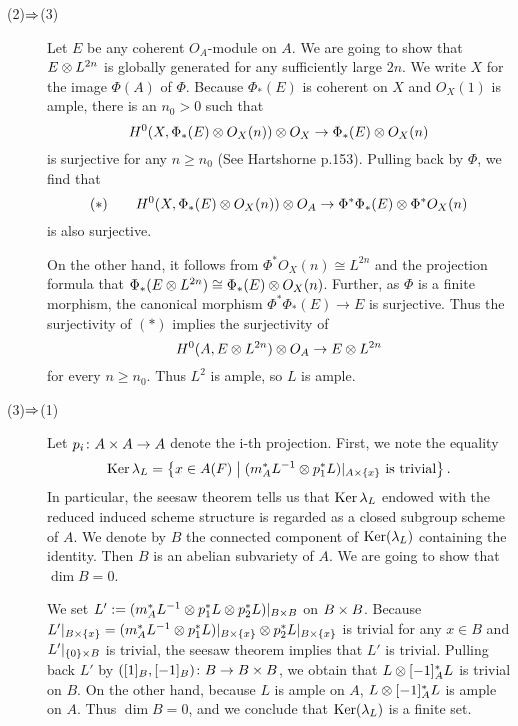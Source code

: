 {\begin{description}
  \item[(2)$\Rightarrow$(3)] Let $E$ be any coherent $O_A$-module on $A$. We are going to show that $E \otimes L^{2n}$ is globally generated for any sufficiently large $2n$. We write $X$ for the image $\Phi(A)$ of $\Phi$. Because $\Phi_*(E)$ is coherent on $X$ and $O_X(1)$ is ample, there is an $n_0 > 0$ such that
  \[
  H^0(X, \Phi_*(E) \otimes O_X(n) ) \otimes O_X \to \Phi_*(E) \otimes O_X(n)
  \]
  is surjective for any $n \geq n_0$ (See Hartshorne p.153). Pulling back by $\Phi$, we find that
  \[
  (*)  \quad  \quad    H^0(X, \Phi_*(E) \otimes O_X(n) ) \otimes O_A \to \Phi^* \Phi_*(E) \otimes \Phi^* O_X(n)
  \]
  is also surjective.

  On the other hand, it follows from $\Phi^* O_X(n) \cong L^{2n}$ and the projection formula that $\Phi_*(E \otimes L^{2n}) \cong \Phi_*(E) \otimes O_X(n)$. Further, as $\Phi$ is a finite morphism, the canonical morphism $\Phi^* \Phi_*(E) \to E$ is surjective. Thus the surjectivity of $(*)$ implies the surjectivity of
  \[
  H^0(A, E \otimes L^{2n} ) \otimes O_A \to E \otimes L^{2n}
  \]
  for every $n \geq n_0$. Thus $L^2$ is ample, so $L$ is ample.

  \item[(3)$\Rightarrow$(1)] Let $p_i \colon A \times A \to A$ denote the i-th projection. First, we note the equality
  \[
  \operatorname{Ker} {\lambda}_L = \left\{  x \in A(F)   \mathrel{} \middle| \mathrel{}  (m_A^* L^{-1} \otimes p_1^* L)|_{A \times \{ x \} } \text{ is trivial}   \right\}.
  \]
  In particular, the seesaw theorem tells us that $\operatorname{Ker} {\lambda}_L$ endowed with the reduced induced scheme structure is regarded as a closed subgroup scheme of $A$. We denote by $B$ the connected component of $\operatorname{Ker}({\lambda}_L)$ containing the identity. Then $B$ is an abelian subvariety of $A$. We are going to show that $\dim B = 0$.

  We set $L' := (m_A^* L^{-1} \otimes p_1^* L \otimes p_2^* L)|_{B \times B}$ on $B \times B$. Because $L'|_{B \times \{x\}} = (m_A^* L^{-1} \otimes p_1^* L)|_{B \times \{x\}} \otimes p_2^* L|_{B \times \{x\}}$ is trivial for any $x \in B$
  and $L'|_{ \{0\} \times B}$ is trivial, the seesaw theorem implies that $L'$ is trivial. Pulling back $L'$ by $([1]_B, [-1]_B) \colon B \to B \times B$, we obtain that $L \otimes [-1]_A^* L $ is trivial on $B$. On the other hand, because $L$ is ample on $A$, $L \otimes [-1]_A^* L$ is ample on $A$. Thus $\dim B = 0$,
   and we conclude that $\operatorname{Ker}({\lambda}_L)$ is a finite set.
  \end{description}

}
